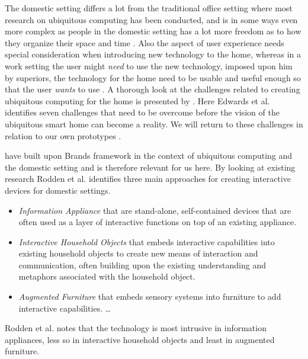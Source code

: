 The domestic setting differs a lot from the traditional office setting where most research on ubiquitous computing has been conducted, and is in some ways even more complex as people in the domestic setting has a lot more freedom as to how they organize their space and time \cite{meyer2003survey}.
Also the aspect of user experience needs special consideration when introducing new technology to the home, whereas in a work setting the user might \emph{need} to use the new technology, imposed upon him by superiors, the technology for the home need to be usable and useful enough so that the user \emph{wants} to use \citep{meyer2003survey}.
A thorough look at the challenges related to creating ubiquitous computing for the home is presented by \citet{edwards2001home}.
Here Edwards et al. identifies seven challenges that need to be overcome before the vision of the ubiquitous smart home can become a reality. We will return to these challenges in relation to our own prototypes .

\citet{rodden2003evolution} have built upon Brands framework in the context of ubiquitous computing and the domestic setting and is therefore relevant for us here.
By looking at existing research Rodden et al. identifies three main approaches for creating interactive devices for domestic settings.

\begin{itemize}
  \item \emph{Information Appliance} that are stand-alone, self-contained devices that are often used as a layer of interactive functions on top of an existing appliance.
  \item \emph{Interactive Household Objects} that embeds interactive capabilities into existing household objects to create new means of interaction and communication, often building upon the existing understanding and metaphors associated with the household object.
  \item \emph{Augmented Furniture} that embeds sensory systems into furniture to add interactive capabilities. \ldots
\end{itemize}

Rodden et al. notes that the technology is most intrusive in information appliances, less so in interactive household objects and least in augmented furniture.

 

